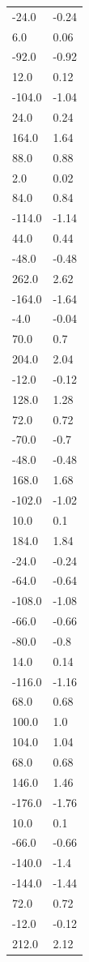 \begin{longtable}{ll}
-24.0 & -0.24 \\
6.0 & 0.06 \\
-92.0 & -0.92 \\
12.0 & 0.12 \\
-104.0 & -1.04 \\
24.0 & 0.24 \\
164.0 & 1.64 \\
88.0 & 0.88 \\
2.0 & 0.02 \\
84.0 & 0.84 \\
-114.0 & -1.14 \\
44.0 & 0.44 \\
-48.0 & -0.48 \\
262.0 & 2.62 \\
-164.0 & -1.64 \\
-4.0 & -0.04 \\
70.0 & 0.7 \\
204.0 & 2.04 \\
-12.0 & -0.12 \\
128.0 & 1.28 \\
72.0 & 0.72 \\
-70.0 & -0.7 \\
-48.0 & -0.48 \\
168.0 & 1.68 \\
-102.0 & -1.02 \\
10.0 & 0.1 \\
184.0 & 1.84 \\
-24.0 & -0.24 \\
-64.0 & -0.64 \\
-108.0 & -1.08 \\
-66.0 & -0.66 \\
-80.0 & -0.8 \\
14.0 & 0.14 \\
-116.0 & -1.16 \\
68.0 & 0.68 \\
100.0 & 1.0 \\
104.0 & 1.04 \\
68.0 & 0.68 \\
146.0 & 1.46 \\
-176.0 & -1.76 \\
10.0 & 0.1 \\
-66.0 & -0.66 \\
-140.0 & -1.4 \\
-144.0 & -1.44 \\
72.0 & 0.72 \\
-12.0 & -0.12 \\
212.0 & 2.12 \\

\end{longtable}
